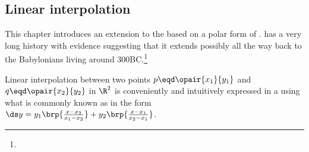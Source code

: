 
\subsection{Linear interpolation}
This chapter introduces an extension to the  based on a polar form of .
has a very long history 
with evidence suggesting that it extends possibly all the way back to 
the Babylonians living around 300BC.\footnote{}

Linear interpolation 
between two points $p\eqd\opair{x_1}{y_1}$ and $q\eqd\opair{x_2}{y_2}$ in $\R^2$ 
is conveniently and intuitively
expressed in a 
using what is commonly known as  in the form 
  \\\indentx$\ds y = y_1\brp{\frac{x-x_2}{x_1-x_2}} + y_2\brp{\frac{x-x_1}{x_2-x_1}}$.\\

